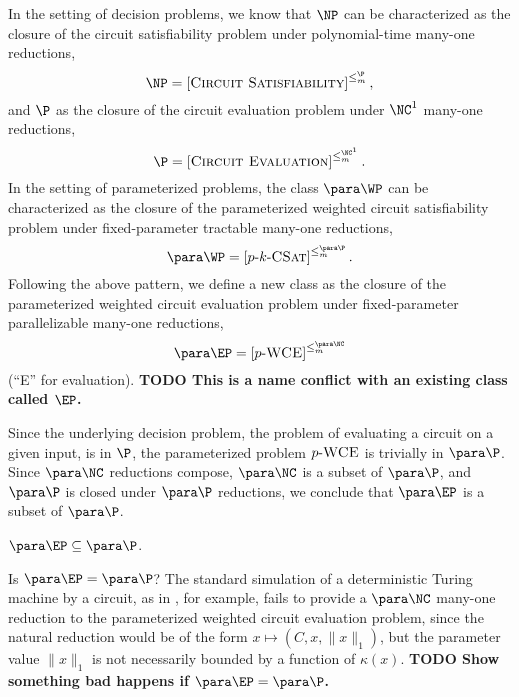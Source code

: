 \documentclass{article}
\newcommand{\todo}[1]{\textbf{TODO #1}}
\newcommand{\dash}{\textnormal{-}}
\newcommand{\pCkSAT}{p \dash k \dash \textsc{CSat}}
\newcommand{\pWCE}{p \dash \textsc{WCE}}
\newcommand{\cl}[1]{\left[{#1}\right]}
\begin{document}

In the setting of decision problems, we know that $\NP$ can be characterized as the closure of the circuit satisfiability problem under polynomial-time many-one reductions,
\[
\NP = \cl{\textsc{Circuit Satisfiability}}^{\leq_m^\P},
\]
and $\P$ as the closure of the circuit evaluation problem under $\NC^1$ many-one reductions,
\[
\P = \cl{\textsc{Circuit Evaluation}}^{\leq_m^{\NC^1}}.
\]
In the setting of parameterized problems, the class $\para \WP$ can be characterized as the closure of the parameterized weighted circuit satisfiability problem under fixed-parameter tractable many-one reductions,
\[
\para \WP = \cl{\pCkSAT}^{\leq_m^{\para \P}}.
\]
Following the above pattern, we define a new class as the closure of the parameterized weighted circuit evaluation problem under fixed-parameter parallelizable many-one reductions,
\[
\para \EP = \cl{\pWCE}^{\leq_m^{\para \NC}}
\]
(``E'' for evaluation).
\todo{This is a name conflict with an existing class called $\EP$.}

Since the underlying decision problem, the problem of evaluating a circuit on a given input, is in $\P$, the parameterized problem $\pWCE$ is trivially in $\para \P$.
Since $\para \NC$ reductions compose, $\para \NC$ is a subset of $\para \P$, and $\para \P$ is closed under $\para \P$ reductions, we conclude that $\para \EP$ is a subset of $\para \P$.

\begin{theorem}
  $\para \EP \subseteq \para \P$.
\end{theorem}

Is $\para \EP = \para \P$?
The standard simulation of a deterministic Turing machine by a circuit, as in \autocite{ladner75}, for example, fails to provide a $\para \NC$ many-one reduction to the parameterized weighted circuit evaluation problem, since the natural reduction would be of the form $x \mapsto (C, x, \|x\|_1)$, but the parameter value $\|x\|_1$ is not necessarily bounded by a function of $\kappa(x)$.
\todo{Show something bad happens if $\para \EP = \para \P$.}
\end{document}

